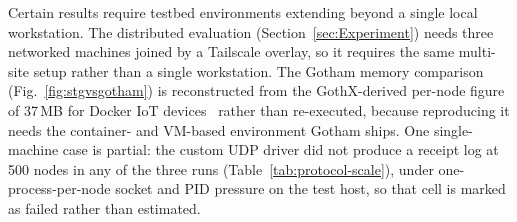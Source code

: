 \documentclass[jsan,article,submit,moreauthors,pdftex]{Definitions/mdpi}
\begin{document}
Certain results require testbed environments extending beyond a single local workstation. The distributed evaluation (Section~\ref{sec:Experiment}) needs three networked machines joined by a Tailscale overlay, so it requires the same multi-site setup rather than a single workstation. The Gotham memory comparison (Fig.~\ref{fig:stgvsgotham}) is reconstructed from the GothX-derived per-node figure of 37\,MB for Docker IoT devices~\cite{poisson2024gothx} rather than re-executed, because reproducing it needs the container- and VM-based environment Gotham ships. One single-machine case is partial: the custom UDP driver did not produce a receipt log at 500 nodes in any of the three runs (Table~\ref{tab:protocol-scale}), under one-process-per-node socket and PID pressure on the test host, so that cell is marked as failed rather than estimated.
\end{document}
